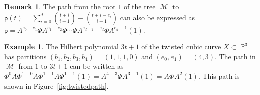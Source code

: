 \documentclass[12pt]{amsart}%
\theoremstyle{definition}%
\newtheorem{example}[theorem]{Example}
\newtheorem{remark}[theorem]{Remark}
\DeclareMathOperator{\PP}{\mathbb{P}}%
\DeclareMathOperator{\Macaulaytree}{\mathscr{M}}%
\newcommand{\hp}{\mathsf{p}}%
\newcommand{\lift}{\Phi}%
\newcommand{\plus}{A}%
\begin{document}
\begin{remark}%
  \label{rmk:pathexpressions} 
  The path from the root $1$ of the tree $\Macaulaytree$ to $\hp(t) =
  \sum_{i=0}^d \binom{t + i}{i+1} - \binom{t + i - e_i}{i+1}$ can also
  be expressed as $\hp = \plus^{e_0 - e_1} \lift \plus^{e_1 - e_2}
  \lift \dotsb \lift \plus^{e_{d-1} - e_d} \lift \plus^{e_d - 1} (1)$.
\end{remark}

\begin{example}%
  The Hilbert polynomial $3t+1$ of the twisted cubic curve $X \subset
  \PP^3$ has partitions $(b_1, b_2, b_3, b_4) = (1,1,1,0)$ and $(e_0,
  e_1) = (4,3)$.  The path in $\Macaulaytree$ from $1$ to $3t+1$ can
  be written as $\lift^0 \plus \lift^{1-0} \plus \lift^{1-1} \plus
  \lift^{1-1} (1) = \plus^{4-3} \lift \plus^{3-1}(1) = \plus \lift
  \plus^{2}(1)$.  This path is shown in Figure~\ref{fig:twistedpath}.
\end{example}
\end{document}
